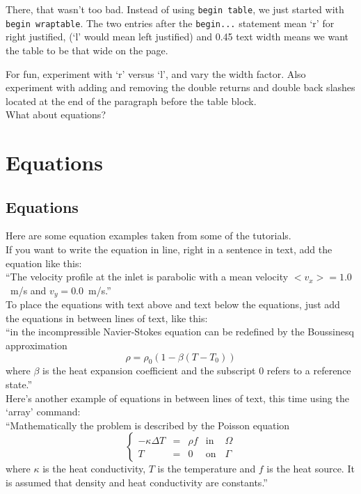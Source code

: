 There, that wasn't too bad.  Instead of using \texttt{begin table}, we just started with \texttt{begin wraptable}.  The two entries after the \texttt{begin...} statement mean `r' for right justified, (`l' would mean left justified) and 0.45 text width means we want the table to be that wide on the page.  

For fun, experiment with `r' versus `l', and vary the width factor.  Also experiment with adding and removing  the double returns and double back slashes located at the end of the paragraph before the table block.\\

What about equations?

\chapter{Equations}

\section{Equations}

Here are some equation examples taken from some of the tutorials.\\

\noindent If you want to write the equation in line, right in a sentence in text, add the equation like this:\\

``The velocity profile at the inlet is parabolic with a mean velocity $<v_x>=1.0$~m/s and $v_y=0.0$~m/s.''\\

\noindent To place the equations with text above and text below the equations, just add the equations in between lines of text, like this:\\

``in the incompressible Navier-Stokes equation can be redefined by the Boussinesq approximation
\begin{displaymath}
\rho = {\rho}_0(1-\beta(T-{T}_0))
\end{displaymath}
where $\beta$ is the heat expansion coefficient and the subscript 0 refers to a reference state.''\\

\noindent Here's another example of equations in between lines of text, this time using the `array' command:\\

``Mathematically the problem is described by the Poisson equation
\begin{equation}
\left \{
\begin{array}{ccccc}
- \kappa \Delta T &= &\rho f & \mathrm{ in } \, \, & \Omega \\
T&=&0 & \mathrm{ on } & \Gamma
\end{array}
\right .
\end{equation}
where $\kappa$ is the heat conductivity, $T$  is the temperature and $f$ is the heat source. It is assumed that density and heat conductivity are constants.''\\

